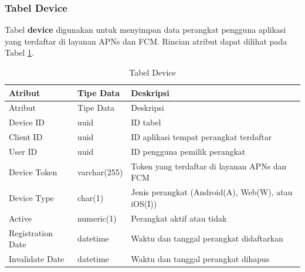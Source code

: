 \subsubsection{Tabel Device}
\par Tabel \textbf{device} digunakan untuk menyimpan data perangkat pengguna aplikasi yang terdaftar di layanan APNs dan FCM. Rincian atribut dapat dilihat pada Tabel \ref{tabel_device}.
\begin{longtable}{|p{2cm}|p{2.5cm}|p{4.5cm}|}
	\caption{Tabel Device} \label{tabel_device} \\ \hline
    \rowcolor{lightgray} {Atribut} & {Tipe Data} & {Deskripsi} \\ \hline
    \endfirsthead
    \hline
    \rowcolor{lightgray} {Atribut} & {Tipe Data} & {Deskripsi} \\ \hline
    \endhead
    Device ID & uuid & ID tabel \\ \hline
    Client ID & uuid & ID aplikasi tempat perangkat terdaftar \\ \hline
    User ID & uuid & ID pengguna pemilik perangkat \\ \hline
    Device Token & varchar(255) & Token yang terdaftar di layanan APNs dan FCM \\ \hline
    Device Type & char(1) & Jenis perangkat (Android(A), Web(W), atau iOS(I)) \\ \hline
    Active & numeric(1) & Perangkat aktif atau tidak \\ \hline
    Registration Date & datetime & Waktu dan tanggal perangkat didaftarkan \\ \hline
    Invalidate Date & datetime & Waktu dan tanggal perangkat dihapus \\ \hline
\end{longtable}

